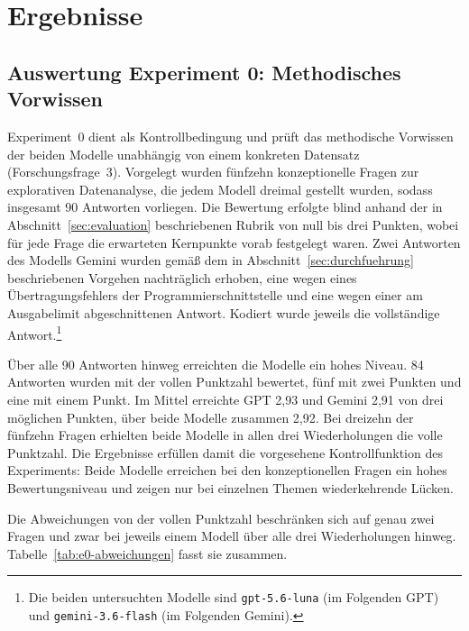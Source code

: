 \chapter{Ergebnisse}
\label{ch:results}

\section{Auswertung Experiment 0: Methodisches Vorwissen}
\label{sec:ergebnisse-e0}

Experiment~0 dient als Kontrollbedingung und prüft das methodische Vorwissen der beiden Modelle unabhängig von einem konkreten Datensatz (Forschungsfrage~3). Vorgelegt wurden fünfzehn konzeptionelle Fragen zur explorativen Datenanalyse, die jedem Modell dreimal gestellt wurden, sodass insgesamt 90 Antworten vorliegen. Die Bewertung erfolgte blind anhand der in Abschnitt~\ref{sec:evaluation} beschriebenen Rubrik von null bis drei Punkten, wobei für jede Frage die erwarteten Kernpunkte vorab festgelegt waren. Zwei Antworten des Modells Gemini wurden gemäß dem in Abschnitt~\ref{sec:durchfuehrung} beschriebenen Vorgehen nachträglich erhoben, eine wegen eines Übertragungsfehlers der Programmierschnittstelle und eine wegen einer am Ausgabelimit abgeschnittenen Antwort. Kodiert wurde jeweils die vollständige Antwort.\footnote{Die beiden untersuchten Modelle sind \texttt{gpt-5.6-luna} (im Folgenden GPT) und \texttt{gemini-3.6-flash} (im Folgenden Gemini).}

Über alle 90 Antworten hinweg erreichten die Modelle ein hohes Niveau. 84 Antworten wurden mit der vollen Punktzahl bewertet, fünf mit zwei Punkten und eine mit einem Punkt. Im Mittel erreichte GPT 2,93 und Gemini 2,91 von drei möglichen Punkten, über beide Modelle zusammen 2,92. Bei dreizehn der fünfzehn Fragen erhielten beide Modelle in allen drei Wiederholungen die volle Punktzahl. Die Ergebnisse erfüllen damit die vorgesehene Kontrollfunktion des Experiments: Beide Modelle erreichen bei den konzeptionellen Fragen ein hohes Bewertungsniveau und zeigen nur bei einzelnen Themen wiederkehrende Lücken.

Die Abweichungen von der vollen Punktzahl beschränken sich auf genau zwei Fragen und zwar bei jeweils einem Modell über alle drei Wiederholungen hinweg. Tabelle~\ref{tab:e0-abweichungen} fasst sie zusammen.

